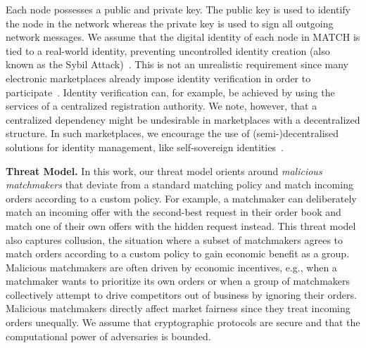 Each node possesses a public and private key.
The public key is used to identify the node in the network whereas the private key is used to sign all outgoing network messages.
We assume that the digital identity of each node in MATCH is tied to a real-world identity, preventing uncontrolled identity creation (also known as the Sybil Attack)~\cite{douceur2002sybil}.
This is not an unrealistic requirement since many electronic marketplaces already impose identity verification in order to participate~\cite{damiani2003managing}.
Identity verification can, for example, be achieved by using the services of a centralized registration authority.
We note, however, that a centralized dependency might be undesirable in marketplaces with a decentralized structure.
In such marketplaces, we encourage the use of (semi-)decentralised solutions for identity management, like self-sovereign identities~\cite{muhle2018survey,stokkink2020truly}.

\textbf{Threat Model.}
\label{sec:threat_model}
In this work, our threat model orients around \emph{malicious matchmakers} that deviate from a standard matching policy and match incoming orders according to a custom policy.
For example, a matchmaker can deliberately match an incoming offer with the second-best request in their order book and match one of their own offers with the hidden request instead.
This threat model also captures collusion, the situation where a subset of matchmakers agrees to match orders according to a custom policy to gain economic benefit as a group.
Malicious matchmakers are often driven by economic incentives, e.g., when a matchmaker wants to prioritize its own orders or when a group of matchmakers collectively attempt to drive competitors out of business by ignoring their orders.
Malicious matchmakers directly affect market fairness since they treat incoming orders unequally.
We assume that cryptographic protocols are secure and that the computational power of adversaries is bounded.

